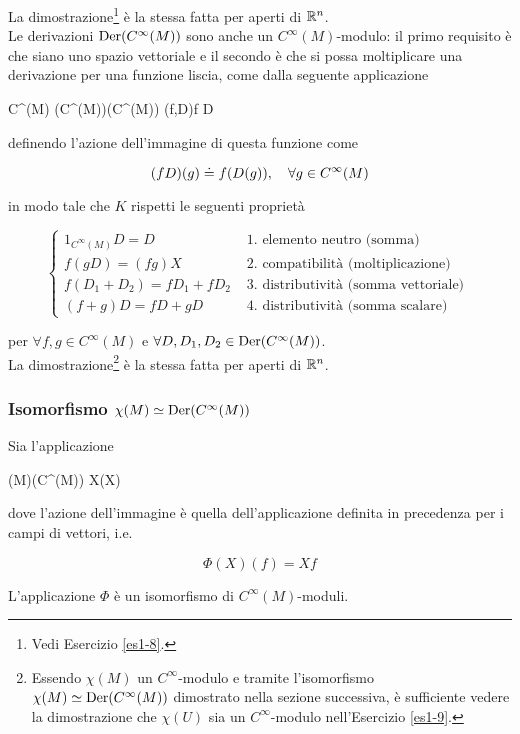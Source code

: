 La dimostrazione\footnote{%
	Vedi Esercizio \ref{es1-8}.%
} è la stessa fatta per aperti di $ \mathbb{R}^{n} $.\\
Le derivazioni $ \operatorname{Der}(C^{\infty}(M)) $ sono anche un $ C^{\infty}(M) $-modulo: il primo requisito è che siano uno spazio vettoriale e il secondo è che si possa moltiplicare una derivazione per una funzione liscia, come dalla seguente applicazione

	{C^{\infty}(M) \times \der(C^{\infty}(M))}{\der(C^{\infty}(M))}
	{(f,D)}{f D}

definendo l'azione dell'immagine di questa funzione come

\begin{equation}
	(f D)(g) \doteq f (D(g)) \qcomma \forall g \in C^{\infty}(M)
\end{equation}

in modo tale che $ K $ rispetti le seguenti proprietà

\begin{equation}
	\begin{cases}
		1_{C^{\infty}(M)} D = D & \text{ 1. elemento neutro (somma) } \\
		f (g D) = (f g) X & \text{ 2. compatibilità (moltiplicazione) } \\
		f (D_{1} + D_{2}) = f D_{1} + f D_{2} & \text{ 3. distributività (somma vettoriale) } \\
		(f + g) D = f D + g D & \text{ 4. distributività (somma scalare) }
	\end{cases}
\end{equation}

per $ \forall f,g \in C^{\infty}(M) $ e $ \forall D,D_{1},D_{2} \in \operatorname{Der}(C^{\infty}(M)) $.\\
La dimostrazione\footnote{%
	Essendo $ \chi(M) $ un $ C^{\infty} $-modulo e tramite l'isomorfismo $ \chi(M) \simeq \operatorname{Der}(C^{\infty}(M)) $ dimostrato nella sezione successiva, è sufficiente vedere la dimostrazione che $ \chi(U) $ sia un $ C^{\infty} $-modulo nell'Esercizio \ref{es1-9}.%
} è la stessa fatta per aperti di $ \mathbb{R}^{n} $.

\subsubsection{Isomorfismo $ \chi(M) \simeq \operatorname{Der}(C^{\infty}(M)) $}

\begin{theorem}
	Sia l'applicazione
	
	\map{\Phi}
		{\chi(M)}{\der(C^{\infty}(M))}
		{X}{\Phi(X)}

	dove l'azione dell'immagine è quella dell'applicazione definita in precedenza per i campi di vettori, i.e.
	
	\begin{equation}
		\Phi(X)(f) = X f
	\end{equation}

	L'applicazione $ \Phi $ è un isomorfismo di $ C^{\infty}(M) $-moduli.
\end{theorem}

